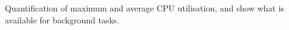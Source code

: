 \documentclass[main.tex]{subfiles}
\begin{document}
Quantification of maximum and average CPU utilisation, and show what is available for background tasks.
\end{document}
